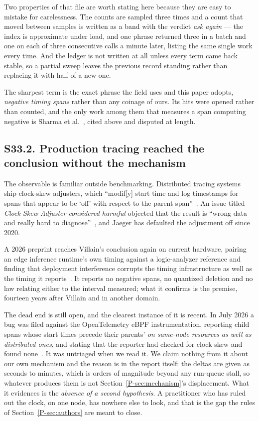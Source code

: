 \documentclass[10pt,journal,onecolumn]{IEEEtran}
\newcommand{\mainModeA}{\ref{P-sec:mechanism}}             %
\newcommand{\mainAuthors}{\ref{P-sec:authors}}        %
\begin{document}
Two properties of that file are worth stating here because they are easy to mistake for
carelessness. The counts are sampled three times and a count that moved between samples is
written as a band with the verdict \emph{ask again} --- the index is approximate under load,
and one phrase returned three in a batch and one on each of three consecutive calls a minute
later, listing the same single work every time. And the ledger is not written at all unless
every term came back stable, so a partial sweep leaves the previous record standing rather
than replacing it with half of a new one.

The sharpest term is the exact phrase the field uses and this paper adopts,
\emph{negative timing spans} rather than any coinage of ours. Its hits were opened rather
than counted, and the only work among them that measures a span computing negative is Sharma
et al.~\cite{sharma2026causality}, cited above and disputed at length.


\subsection{S33.2. Production tracing reached the conclusion without the mechanism}

The observable is familiar outside benchmarking. Distributed tracing systems ship clock-skew
adjusters, which ``modif[y] start time and log timestamps for spans that appear to be `off'
with respect to the parent span''~\cite{jaeger_clockskew}. An issue titled \emph{Clock Skew
Adjuster considered harmful} objected that the result is ``wrong data and really hard to
diagnose''~\cite{jaeger_harmful}, and Jaeger has defaulted the adjustment off since 2020.

A 2026 preprint reaches Villain's conclusion again on current hardware, pairing an edge
inference runtime's own timing against a logic-analyzer reference and finding that deployment
interference corrupts the timing infrastructure as well as the timing it
reports~\cite{swami2026observability}. It reports no negative spans, no quantized deletion and
no law relating either to the interval measured; what it confirms is the premise, fourteen
years after Villain and in another domain.

The dead end is still open, and the clearest instance of it is recent. In July 2026 a bug was
filed against the OpenTelemetry eBPF instrumentation, reporting child spans whose start times
precede their parents' \emph{on same-node resources as well as distributed ones}, and stating
that the reporter had checked for clock skew and found none~\cite{otel_obi_2568}. It was
untriaged when we read it. We claim nothing from it about our own mechanism and the reason is
in the report itself: the deltas are given as seconds to minutes, which is orders of magnitude
beyond any run-queue stall, so whatever produces them is not Section~\mainModeA{}'s
displacement. What it evidences is the \emph{absence of a second hypothesis}. A practitioner
who has ruled out the clock, on one node, has nowhere else to look, and that is the gap the
rules of Section~\mainAuthors{} are meant to close.
\end{document}
